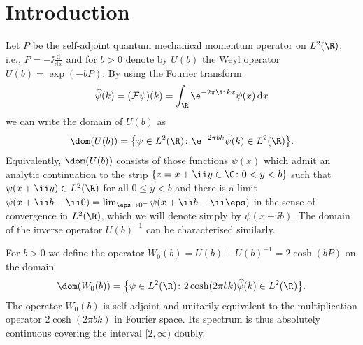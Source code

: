 \section{Introduction}

Let $P$ be the self-adjoint quantum mechanical momentum operator on $L^2(\R)$, i.e., $P=-\ii\frac{\mathrm{d}}{\mathrm{d}x}$ and for $b>0$ denote by $U(b)$ the Weyl operator $U(b)=\exp(-bP)$. By using the Fourier transform
\begin{gather*}
\widehat{\psi}(k)=(\mathcal{F}\psi)(k)=\int_{\R}\e^{-2\pi\ii kx}\psi(x)\,{\rm d} x
\end{gather*}
we can write the domain of $U(b)$ as
\begin{gather*}
\dom(U(b))=\big\{\psi\in L^2(\R)\colon \e^{-2\pi b k}\widehat{\psi}(k)\in L^2(\R)\big\}.
\end{gather*}
Equivalently, $\dom(U(b))$ consists of those functions $\psi(x)$ which admit an analytic continuation to the strip $\{z = x+\ii y\in\C\colon 0<y <b\}$ such that $\psi(x +\ii y) \in L^2(\R)$ for all $0\leq y < b$ and there is a limit $\psi(x +\ii b - \ii 0) = \lim_{\eps\to 0^+}\psi (x + \ii b - \ii\eps)$ in the sense of convergence in $L^2(\R)$, which we will denote simply by $\psi(x+\ii b)$. The domain of the inverse operator $U(b)^{-1}$ can be characterised similarly.

For $b>0$ we define the operator $W_0(b)=U(b)+U(b)^{-1}=2\cosh(bP)$ on the domain
\begin{gather*}
\dom(W_0(b))=\big\{\psi\in L^2(\R)\colon 2\cosh(2\pi bk)\widehat{\psi}(k)\in L^2(\R)\big\}.
\end{gather*}
The operator $W_0(b)$ is self-adjoint and unitarily equivalent to the multiplication operator \linebreak $2\cosh(2\pi b k)$ in Fourier space. Its spectrum is thus absolutely continuous covering the interval
$[2,\infty)$ doubly.


